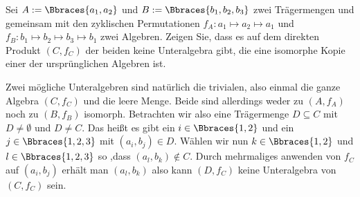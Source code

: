\begin{exercise}
    Sei $A := \Bbraces{a_1, a_2}$ und $B := \Bbraces{b_1, b_2, b_3}$ zwei Trägermengen und gemeinsam mit den zyklischen Permutationen $f_A: a_1 \mapsto a_2 \mapsto a_1$ und $f_B: b_1 \mapsto b_2 \mapsto b_3 \mapsto b_1$ zwei Algebren. Zeigen Sie, dass es auf dem direkten Produkt $(C, f_C)$ der beiden keine Unteralgebra gibt, die eine isomorphe Kopie einer der ursprünglichen Algebren ist.
\end{exercise}

\begin{solution}
    Zwei mögliche Unteralgebren sind natürlich die trivialen, also einmal die ganze Algebra $(C, f_C)$ und die leere Menge. Beide sind allerdings weder zu $(A, f_A)$ noch zu $(B, f_B)$ isomorph. Betrachten wir also eine Trägermenge $D \subseteq C$ mit $D \neq \emptyset$ und $D \neq C$. Das heißt es gibt ein $i \in \Bbraces{1, 2}$ und ein $j \in \Bbraces{1, 2, 3}$ mit $(a_i, b_j) \in D$. Wählen wir nun  $k \in \Bbraces{1, 2}$ und $l \in \Bbraces{1, 2, 3}$ so ,dass $(a_l, b_k) \notin C$. Durch mehrmaliges anwenden von $f_C$ auf $(a_i, b_j)$ erhält man $(a_l, b_k)$ also kann $(D, f_C)$ keine Unteralgebra von $(C, f_C)$ sein.
\end{solution}